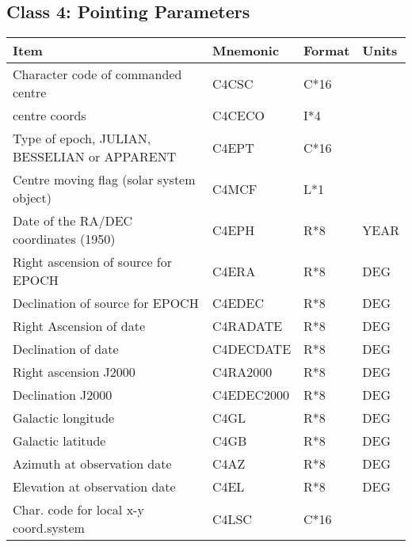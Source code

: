                             
                            
\subsection{Class 4: Pointing Parameters}


\begin{tabular}{||l|l|l|l||} \hline
Item                      & Mnemonic & Format & Units \\ \hline
Character code of commanded centre                             & C4CSC    & C*16   &  ~    \\      
centre coords                                                  & C4CECO   & I*4    &  ~    \\      
Type of epoch, JULIAN, BESSELIAN or APPARENT                   & C4EPT    & C*16   &  ~    \\      
Centre moving flag (solar system object)                       & C4MCF    & L*1    &  ~    \\      
Date of the RA/DEC coordinates (1950)                          & C4EPH    & R*8    & YEAR  \\      
Right ascension of source for EPOCH                            & C4ERA    & R*8    & DEG   \\      
Declination of source for EPOCH                                & C4EDEC   & R*8    & DEG   \\      
Right Ascension of date                                        & C4RADATE & R*8    & DEG   \\      
Declination of date                                            & C4DECDATE& R*8    & DEG   \\      
Right ascension J2000                                          & C4RA2000 & R*8    & DEG   \\      
Declination J2000                                              & C4EDEC2000 & R*8  & DEG   \\      
Galactic longitude                                             & C4GL     & R*8    & DEG   \\      
Galactic latitude                                              & C4GB     & R*8    & DEG   \\      
Azimuth at observation date                                    & C4AZ     & R*8    & DEG   \\      
Elevation at observation date                                  & C4EL     & R*8    & DEG   \\      
Char. code for local x-y coord.system                          & C4LSC    & C*16   &  ~    \\      

\end{tabular}
